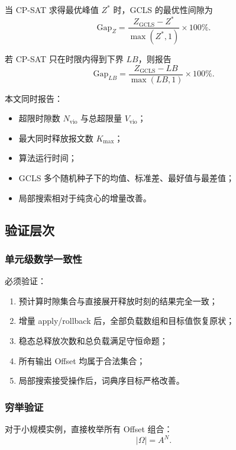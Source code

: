 \documentclass[UTF8,12pt,a4paper]{ctexart}
\begin{document}
当 CP-SAT 求得最优峰值 $Z^*$ 时，GCLS 的最优性间隙为
\begin{equation}
 \mathrm{Gap}_Z=
 \frac{Z_{\mathrm{GCLS}}-Z^*}{\max(Z^*,1)}\times100\%.
\end{equation}

若 CP-SAT 只在时限内得到下界 $LB$，则报告
\begin{equation}
 \mathrm{Gap}_{LB}=
 \frac{Z_{\mathrm{GCLS}}-LB}{\max(LB,1)}\times100\%.
\end{equation}

本文同时报告：

\begin{itemize}
  \item 超限时隙数 $N_{\mathrm{vio}}$ 与总超限量 $V_{\mathrm{vio}}$；
  \item 最大同时释放报文数 $K_{\max}$；
  \item 算法运行时间；
  \item GCLS 多个随机种子下的均值、标准差、最好值与最差值；
  \item 局部搜索相对于纯贪心的增量改善。
\end{itemize}

\subsection{验证层次}

\subsubsection{单元级数学一致性}

必须验证：

\begin{enumerate}
  \item 预计算时隙集合与直接展开释放时刻的结果完全一致；
  \item 增量 apply/rollback 后，全部负载数组和目标值恢复原状；
  \item 稳态总释放次数和总负载满足守恒命题；
  \item 所有输出 Offset 均属于合法集合；
  \item 局部搜索接受操作后，词典序目标严格改善。
\end{enumerate}

\subsubsection{穷举验证}

对于小规模实例，直接枚举所有 Offset 组合：
\begin{equation}
 |\Omega|=A^N.
\end{equation}
\end{document}

